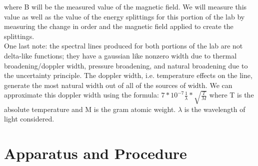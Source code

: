 \documentclass{article}
\begin{document}
    where B will be the measured value of the magnetic field. We will measure this value as well as the value of the energy splittings for this portion of the lab by measuring the change in order and the magnetic field applied to create the splittings.\\\indent One last note: the spectral lines produced for both portions of the lab are not delta-like functions; they have a gaussian like nonzero width due to thermal broadening/doppler width, pressure broadening, and natural broadening due to the uncertainty principle. The doppler width, i.e. temperature effects on the line, generate the most natural width out of all of the sources of width. We can approximate this doppler width using the formula: $7*10^{-7}\frac{1}{\lambda}*\sqrt{\frac{T}{M}}$ where T is the absolute temperature and M is the gram atomic weight. $\lambda$ is the wavelength of light considered. \cite{atm}


\section{Apparatus and Procedure}
\end{document}
